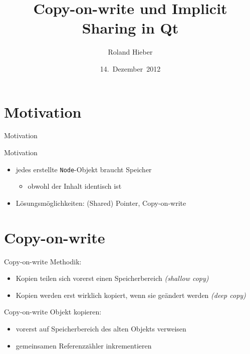 \documentclass{beamer}
\author{Roland Hieber}
\title{Copy-on-write und Implicit Sharing in Qt}
\institute{Stratum~0~e.~V.}
\date{14.~Dezember~2012}
\begin{document}
\begin{frame}
  \titlepage
  \thispagestyle{empty}
\end{frame}

\section{Motivation}
\begin{frame}{Motivation}
  
\end{frame}
\begin{frame}{Motivation}
  
  \begin{itemize}
    \item jedes erstellte \texttt{Node}-Objekt braucht Speicher
    \begin{itemize}
      \item obwohl der Inhalt identisch ist
    \end{itemize}
    \item Lösungsmöglichkeiten: (Shared) Pointer, Copy-on-write
  \end{itemize}
\end{frame}

\section{Copy-on-write}
\begin{frame}{Copy-on-write}
  Methodik:
  \begin{itemize}
    \item Kopien teilen sich vorerst einen Speicherbereich 
      \emph{(shallow copy)}
    \item Kopien werden erst wirklich kopiert, wenn sie geändert werden
      \emph{(deep copy)}
  \end{itemize}
\end{frame}

\begin{frame}{Copy-on-write}
  Objekt kopieren:
    \begin{itemize}
      \item vorerst auf Speicherbereich des alten Objekts verweisen
      \item gemeinsamen Referenzzähler inkrementieren
    \end{itemize}
\end{frame}
\end{document}
